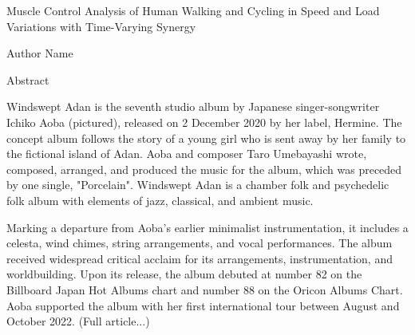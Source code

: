 \pagestyle{empty}

\begin{center}
    Muscle Control Analysis of Human Walking and Cycling in Speed and Load Variations with Time-Varying Synergy
\end{center}
\vspace{10mm}
\begin{center}
    Author Name
\end{center}
\vspace{10mm}

\begin{center}
    Abstract
\end{center}
\vspace{10mm}

Windswept Adan is the seventh studio album by Japanese singer-songwriter Ichiko Aoba (pictured), released on 2 December 2020 by her label, Hermine.
The concept album follows the story of a young girl who is sent away by her family to the fictional island of Adan.
Aoba and composer Taro Umebayashi wrote, composed, arranged, and produced the music for the album, which was preceded by one single, "Porcelain".
Windswept Adan is a chamber folk and psychedelic folk album with elements of jazz, classical, and ambient music.

Marking a departure from Aoba's earlier minimalist instrumentation, it includes a celesta, wind chimes, string arrangements, and vocal performances.
The album received widespread critical acclaim for its arrangements, instrumentation, and worldbuilding.
Upon its release, the album debuted at number 82 on the Billboard Japan Hot Albums chart and number 88 on the Oricon Albums Chart.
Aoba supported the album with her first international tour between August and October 2022.
(Full article...)


\clearpage
\pagestyle{fancy}